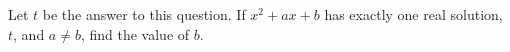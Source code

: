 Let $t$ be the answer to this question. If $x^2 + ax + b$ has exactly one real solution, $t$, and $a \ne b$, find the value of $b$.
